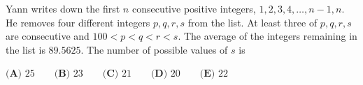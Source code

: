 Yann writes down the first $n$ consecutive positive integers, $1,2,3,4,\dots,n-1,n$. He removes four different integers $p,q,r,s$ from the list. At least three of $p,q,r,s$ are consecutive and $100<p<q<r<s$. The average of the integers remaining in the list is $89.5625$. The number of possible values of $s$ is

$\textbf{(A) }25\qquad\textbf{(B) }23\qquad\textbf{(C) }21\qquad\textbf{(D) }20\qquad\textbf{(E) }22$

